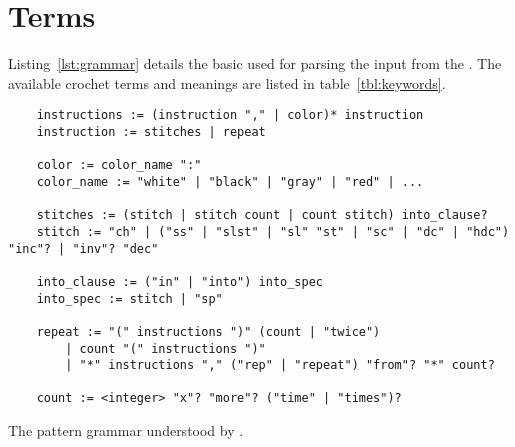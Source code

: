 \documentclass[main.tex]{subfiles}
\begin{document}
\section{Terms}\label{sec:terms}

Listing~\ref{lst:grammar} details the basic  used for parsing the input from the \PTI. The available crochet terms and meanings are listed in table~\ref{tbl:keywords}.

\begin{listing}[htbp]
    \centering
    \begin{verbatim}
    instructions := (instruction "," | color)* instruction
    instruction := stitches | repeat

    color := color_name ":"
    color_name := "white" | "black" | "gray" | "red" | ...

    stitches := (stitch | stitch count | count stitch) into_clause?
    stitch := "ch" | ("ss" | "slst" | "sl" "st" | "sc" | "dc" | "hdc") "inc"? | "inv"? "dec"

    into_clause := ("in" | "into") into_spec
    into_spec := stitch | "sp"

    repeat := "(" instructions ")" (count | "twice")
        | count "(" instructions ")"
        | "*" instructions "," ("rep" | "repeat") "from"? "*" count?

    count := <integer> "x"? "more"? ("time" | "times")?
    \end{verbatim}
    \caption{The pattern grammar understood by \CC.}
    \label{lst:grammar}
\end{listing}
\end{document}
